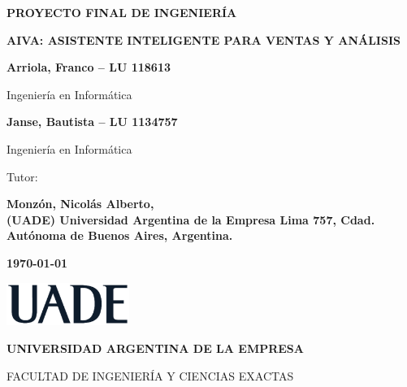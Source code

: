 \begin{titlepage}
    \centering

    {\textbf{\fontsize{18}{20}\selectfont PROYECTO FINAL DE INGENIERÍA} \par}
    \vspace{1.5cm}

    {\textbf{\fontsize{16}{18}\selectfont AIVA: ASISTENTE INTELIGENTE PARA VENTAS Y ANÁLISIS} \par}
    \vspace{0.5cm}

    {\textbf{\fontsize{14}{16}\selectfont Arriola, Franco -- LU 118613} \par}
    {\fontsize{14}{16}\selectfont Ingeniería en Informática \par}
    \vspace{1cm}

    {\textbf{\fontsize{14}{16}\selectfont Janse, Bautista -- LU 1134757} \par}
    {\fontsize{14}{16}\selectfont Ingeniería en Informática \par}
    \vspace{1.5cm}

    {\fontsize{14}{16}\selectfont Tutor: \par}
    {\textbf{\fontsize{14}{16}\selectfont Monzón, Nicolás Alberto,
		\\ (UADE) Universidad Argentina de la Empresa Lima 757, Cdad. Autónoma de Buenos Aires, Argentina.
			} \par}
    \vspace{3cm}

	{\textbf{\fontsize{14}{16}\selectfont \today} \par} %
    \vspace{2cm}

    \includegraphics[width=0.30\textwidth]{./images/UADE}\par \vspace{1cm}
    {\textbf{\fontsize{14}{16}\selectfont UNIVERSIDAD ARGENTINA DE LA EMPRESA} \par}
    {\fontsize{14}{16}\selectfont FACULTAD DE INGENIERÍA Y CIENCIAS EXACTAS \par}
\end{titlepage}